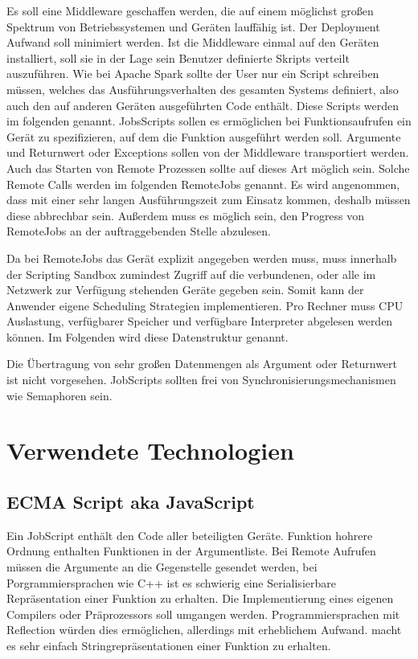 Es soll eine Middleware geschaffen werden, die auf einem möglichst großen Spektrum von Betriebssystemen und Geräten lauffähig ist.
Der Deployment Aufwand soll minimiert werden.
Ist die Middleware einmal auf den Geräten installiert, soll sie in der Lage sein Benutzer definierte Skripts verteilt auszuführen.
Wie bei Apache Spark sollte der User nur ein Script schreiben müssen, welches das Ausführungsverhalten des gesamten Systems definiert, also auch den auf anderen Geräten ausgeführten Code enthält.
Diese Scripts werden im folgenden \jobScript{} genannt.
JobsScripts sollen es ermöglichen bei Funktionsaufrufen ein Gerät zu spezifizieren, auf dem die Funktion ausgeführt werden soll.
Argumente und Returnwert oder Exceptions sollen von der Middleware transportiert werden.
Auch das Starten von Remote Prozessen sollte auf dieses Art möglich sein.
Solche Remote Calls werden im folgenden RemoteJobs genannt.
Es wird angenommen, dass \remoteJobs{} mit einer sehr langen Ausführungszeit zum Einsatz kommen, deshalb müssen diese abbrechbar sein.
Außerdem muss es möglich sein, den Progress von RemoteJobs an der auftraggebenden Stelle abzulesen.

Da bei RemoteJobs das Gerät explizit angegeben werden muss, muss innerhalb der Scripting Sandbox zumindest Zugriff auf die verbundenen, oder alle im Netzwerk zur Verfügung stehenden Geräte gegeben sein.
Somit kann der Anwender eigene Scheduling Strategien implementieren.
Pro Rechner muss CPU Auslastung, verfügbarer Speicher und verfügbare Interpreter abgelesen werden können.
Im Folgenden wird diese Datenstruktur \netInfo{} genannt.

Die Übertragung von sehr großen Datenmengen als Argument oder Returnwert ist nicht vorgesehen.
JobScripts sollten frei von Synchronisierungsmechanismen wie Semaphoren sein.




\section{Verwendete Technologien}

\subsection{ECMA Script aka JavaScript}
Ein JobScript enthält den Code aller beteiligten Geräte.
Funktion hohrere Ordnung enthalten Funktionen in der Argumentliste.
Bei Remote Aufrufen müssen die Argumente an die Gegenstelle gesendet werden, bei Porgrammiersprachen wie C++ ist es schwierig eine Serialisierbare Repräsentation einer Funktion zu erhalten.
Die Implementierung eines eigenen Compilers oder Präprozessors soll umgangen werden.
Programmiersprachen mit Reflection würden dies ermöglichen, allerdings mit erheblichem Aufwand.
\JavaScript{} macht es sehr einfach Stringrepräsentationen einer Funktion zu erhalten.

